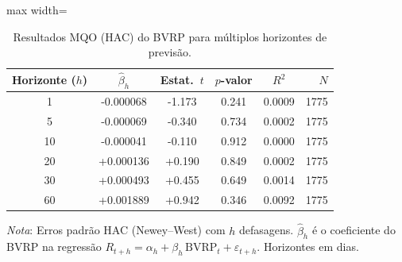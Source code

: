 \begin{table}[H]
\centering
\caption{Resultados MQO (HAC) do BVRP para múltiplos horizontes de previsão.}
\label{tab:ols_basico_multihoriz}
\footnotesize
\begin{adjustbox}{max width=\textwidth}
\begin{tabular}{cccccr}
\toprule
Horizonte ($h$) & $\hat{\beta}_h$ & Estat.\ $t$ & $p$-valor & $R^2$ & $N$ \\
\midrule
  1 & -0.000068 & -1.173 & 0.241 & 0.0009 & 1775 \\
  5 & -0.000069 & -0.340 & 0.734 & 0.0002 & 1775 \\
 10 & -0.000041 & -0.110 & 0.912 & 0.0000 & 1775 \\
 20 & +0.000136 & +0.190 & 0.849 & 0.0002 & 1775 \\
 30 & +0.000493 & +0.455 & 0.649 & 0.0014 & 1775 \\
 60 & +0.001889 & +0.942 & 0.346 & 0.0092 & 1775 \\
\bottomrule
\end{tabular}
\end{adjustbox}
\smallskip
\begin{minipage}{0.92\linewidth}
\footnotesize
\textit{Nota}: Erros padrão HAC (Newey--West) com $h$ defasagens. $\hat{\beta}_h$ é o coeficiente
do BVRP na regressão $R_{t+h} = \alpha_h + \beta_h\,\text{BVRP}_t + \varepsilon_{t+h}$.
Horizontes em dias.
\end{minipage}
\end{table}
